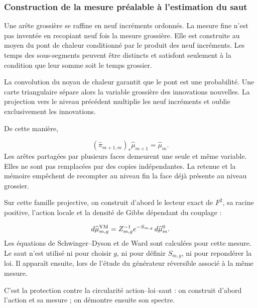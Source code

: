 \subsubsection{Construction de la mesure préalable à l’estimation du saut}
Une arête grossière se raffine en neuf incréments ordonnés. La mesure fine n’est pas inventée en recopiant neuf fois la mesure grossière. Elle est construite au moyen du pont de chaleur conditionné par le produit des neuf incréments. Les temps des sous-segments peuvent être distincts et satisfont seulement à la condition que leur somme soit le temps grossier.\par
La convolution du noyau de chaleur garantit que le pont est une probabilité. Une carte triangulaire sépare alors la variable grossière des innovations nouvelles. La projection vers le niveau précédent multiplie les neuf incréments et oublie exclusivement les innovations.\par
De cette manière,\par
\[
(\widehat\pi_{m+1,m})_*
\widehat\mu_{m+1}
=
\widehat\mu_m.
\]
Les arêtes partagées par plusieurs faces demeurent une seule et même variable. Elles ne sont pas remplacées par des copies indépendantes. La retenue et la mémoire empêchent de recompter au niveau fin la face déjà présente au niveau grossier.\par
Sur cette famille projective, on construit d’abord le lecteur exact de \(F^2\), sa racine positive, l’action locale et la densité de Gibbs dépendant du couplage :\par
\[
d\widehat\mu_{m,g}^{\rm YM}
=
Z_{m,g}^{-1}
e^{-S_{m,g}}\,
d\widehat\mu_m^0.
\]
Les équations de Schwinger–Dyson et de Ward sont calculées pour cette mesure. Le saut n’est utilisé ni pour choisir \(g\), ni pour définir \(S_{m,g}\), ni pour repondérer la loi. Il apparaît ensuite, lors de l’étude du générateur réversible associé à la même mesure.\par
C’est la protection contre la circularité action–loi–saut : on construit d’abord l’action et sa mesure ; on démontre ensuite son spectre.\par
{}
